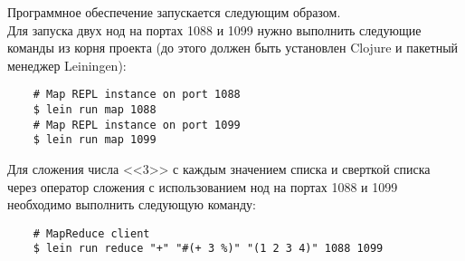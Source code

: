 \documentclass[document.tex]{subfiles}
\begin{document}
\begin{flushleft}
  Программное обеспечение запускается следующим образом. \\
  Для запуска двух нод на портах 1088 и 1099 нужно выполнить следующие
  команды из корня проекта (до этого должен быть установлен Clojure и
  пакетный менеджер Leiningen):
  \begin{lstlisting}
    # Map REPL instance on port 1088
    $ lein run map 1088
    # Map REPL instance on port 1099
    $ lein run map 1099
  \end{lstlisting}

  Для сложения числа <<3>> с каждым значением списка и сверткой списка через
  оператор сложения с использованием нод на портах 1088 и 1099 необходимо
  выполнить следующую команду:
  \begin{lstlisting}
    # MapReduce client
    $ lein run reduce "+" "#(+ 3 %)" "(1 2 3 4)" 1088 1099
  \end{lstlisting}

\end{flushleft}
\end{document}

